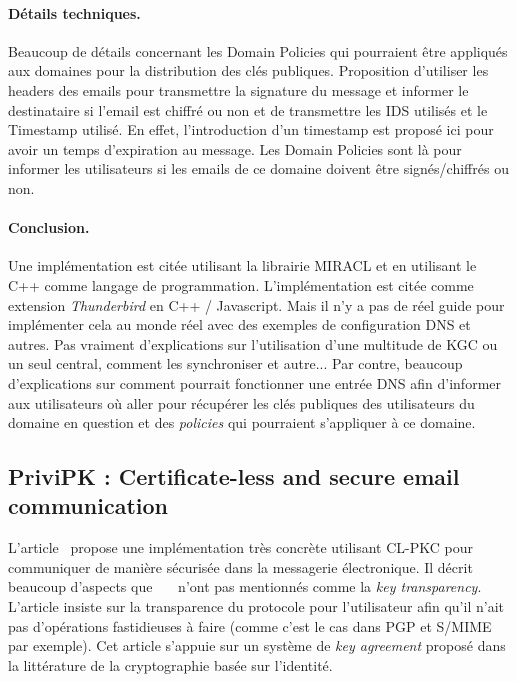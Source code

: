 \paragraph*{Détails techniques.} Beaucoup de détails concernant les Domain Policies qui pourraient être appliqués aux domaines pour la distribution des clés publiques. Proposition d'utiliser les headers des emails pour transmettre la signature du message et informer le destinataire si l'email est chiffré ou non et de transmettre les IDS utilisés et le Timestamp utilisé. En effet, l'introduction d'un timestamp est proposé ici pour avoir un temps d'expiration au message. Les Domain Policies sont là pour informer les utilisateurs si les emails de ce domaine doivent être signés/chiffrés ou non.

\paragraph*{Conclusion.} Une implémentation est citée utilisant la librairie MIRACL et en utilisant le C++ comme langage de programmation. L'implémentation est citée comme extension \textit{Thunderbird} en C++ / Javascript. Mais il n'y a pas de réel guide pour implémenter cela au monde réel avec des exemples de configuration DNS et autres. Pas vraiment d'explications sur l'utilisation d'une multitude de KGC ou un seul central, comment les synchroniser et autre... Par contre, beaucoup d'explications sur comment pourrait fonctionner une entrée DNS afin d'informer aux utilisateurs où aller pour récupérer les clés publiques des utilisateurs du domaine en question et des \textit{policies} qui pourraient s'appliquer à ce domaine.

\subsection{PriviPK : Certificate-less and secure email communication}
L'article~\cite{journals/compsec/AlSabahTLSD17} propose une implémentation très concrète utilisant CL-PKC pour communiquer de manière sécurisée dans la messagerie électronique. Il décrit beaucoup d'aspects que~\cite{conf/itcs2/ErYTG12}~\cite{endToEndSecureEmailArticle}~\cite{journals/ijnsec/BalakrishnanR16} n'ont pas mentionnés comme la \textit{key transparency}. L'article insiste sur la transparence du protocole pour l'utilisateur afin qu'il n'ait pas d'opérations fastidieuses à faire (comme c'est le cas dans PGP et S/MIME par exemple). Cet article s'appuie sur un système de \textit{key agreement} proposé dans la littérature de la cryptographie basée sur l'identité.

